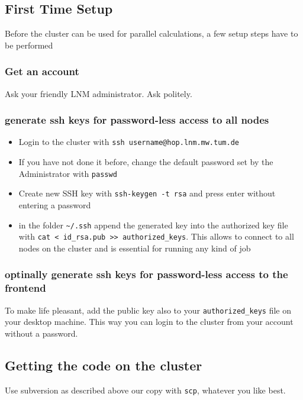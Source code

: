 \subsection{First Time Setup }

Before the cluster can be used for parallel calculations, a few setup
steps have to be performed


\subsubsection{Get an account}

Ask your friendly LNM administrator. Ask politely.


\subsubsection{generate ssh keys for password-less access to all nodes}

\begin{itemize}
\item Login to the cluster with \texttt{ssh username@hop.lnm.mw.tum.de}
\item If you have not done it before, change the default password set by
the Administrator with \texttt{passwd }
\item Create new SSH key with \texttt{ssh-keygen -t rsa} and press enter
without entering a password
\item in the folder \texttt{\textasciitilde{}/.ssh} append the generated key
into the authorized key file with \texttt{cat < id\_rsa.pub >> authorized\_keys}.
This allows to connect to all nodes on the cluster and is essential
for running any kind of job
\end{itemize}

\subsubsection{optinally generate ssh keys for password-less access to the frontend }

To make life pleasant, add the public key also to your \texttt{authorized\_keys}
file on your desktop machine. This way you can login to the cluster
from your account without a password.


\subsection{Getting the code on the cluster}

Use subversion as described above our copy with \texttt{scp}, whatever
you like best.


